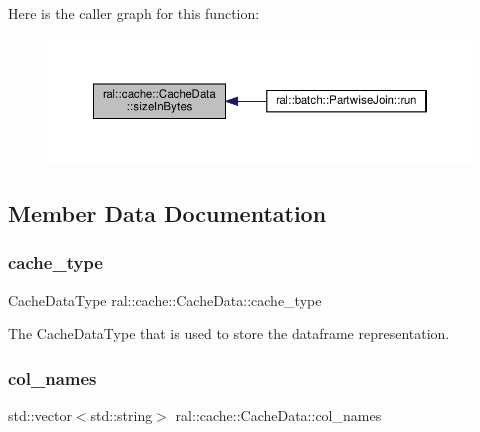 Here is the caller graph for this function\+:\nopagebreak
\begin{figure}[H]
\begin{center}
\leavevmode
\includegraphics[width=350pt]{classral_1_1cache_1_1CacheData_aaad8a726296574845f01f9380dcee40d_icgraph}
\end{center}
\end{figure}


\subsection{Member Data Documentation}
\mbox{\label{classral_1_1cache_1_1CacheData_acf9d130e22baac61d4689c52e36b9c17}} 
\subsubsection{\texorpdfstring{cache\+\_\+type}{cache\_type}}
{\footnotesize\ttfamily Cache\+Data\+Type ral\+::cache\+::\+Cache\+Data\+::cache\+\_\+type\hspace{0.3cm}{\ttfamily [protected]}}

The Cache\+Data\+Type that is used to store the dataframe representation. \mbox{\label{classral_1_1cache_1_1CacheData_a7a43a46a362c8fe93a7af81debbeca1b}} 
\subsubsection{\texorpdfstring{col\+\_\+names}{col\_names}}
{\footnotesize\ttfamily std\+::vector$<$std\+::string$>$ ral\+::cache\+::\+Cache\+Data\+::col\+\_\+names\hspace{0.3cm}{\ttfamily [protected]}}

